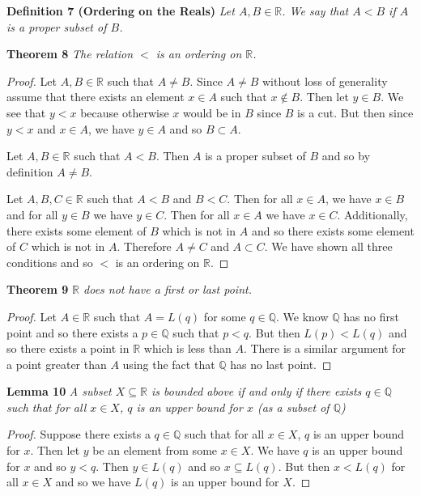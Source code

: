 \documentclass{article}
\begin{document}
\begin{flushleft}
\textbf{Definition 7 (Ordering on the Reals)}
\textsl{Let $A, B \in \mathbb{R}$. We say that $A < B$ if $A$ is a proper subset of $B$.}
\newline

\textbf{Theorem 8}
\textsl{The relation $<$ is an ordering on $\mathbb{R}$.}
\begin{proof}
Let $A, B \in \mathbb{R}$ such that $A \neq B$. Since $A \neq B$ without loss of generality assume that there exists an element $x \in A$ such that $x \notin B$. Then let $y \in B$. We see that $y<x$ because otherwise $x$ would be in $B$ since $B$ is a cut. But then since $y<x$ and $x \in A$, we have $y \in A$ and so $B \subset A$.\newline

Let $A, B \in \mathbb{R}$ such that $A<B$. Then $A$ is a proper subset of $B$ and so by definition $A \neq B$.\newline

Let $A, B, C \in \mathbb{R}$ such that $A < B$ and $B < C$. Then for all $x \in A$, we have $x \in B$ and for all $y \in B$ we have $y \in C$. Then for all $x \in A$ we have $x \in C$. Additionally, there exists some element of $B$ which is not in $A$ and so there exists some element of $C$ which is not in $A$. Therefore $A \neq C$ and $A \subset C$. We have shown all three conditions and so $<$ is an ordering on $\mathbb{R}$.
\end{proof}

\textbf{Theorem 9}
\textsl{$\mathbb{R}$ does not have a first or last point.}
\begin{proof}
Let $A \in \mathbb{R}$ such that $A = L(q)$ for some $q \in \mathbb{Q}$. We know $\mathbb{Q}$ has no first point and so there exists a $p \in \mathbb{Q}$ such that $p<q$. But then $L(p) < L(q)$ and so there exists a point in $\mathbb{R}$ which is less than $A$. There is a similar argument for a point greater than $A$ using the fact that $\mathbb{Q}$ has no last point.
\end{proof}

\textbf{Lemma 10}
\textsl{A subset $X \subseteq \mathbb{R}$ is bounded above if and only if there exists $q \in \mathbb{Q}$ such that for all $x \in X$, $q$ is an upper bound for $x$ (as a subset of $\mathbb{Q}$)}
\begin{proof}
Suppose there exists a $q \in \mathbb{Q}$ such that for all $x \in X$, $q$ is an upper bound for $x$. Then let $y$ be an element from some $x \in X$. We have $q$ is an upper bound for $x$ and so $y<q$. Then $y \in L(q)$ and so $x \subseteq L(q)$. But then $x < L(q)$ for all $x \in X$ and so we have $L(q)$ is an upper bound for $X$.\newline


\end{proof}
\end{flushleft}
\end{document}
